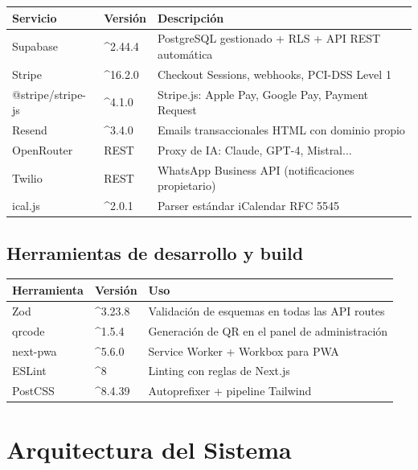 \documentclass[12pt,a4paper,twoside,openright]{report}
\begin{document}
\begin{longtable}{L{3.5cm} C{2cm} L{7cm}}
  \toprule
  \textbf{Servicio} & \textbf{Versión} & \textbf{Descripción} \\
  \midrule
  Supabase & \textasciicircum 2.44.4 & PostgreSQL gestionado + RLS + API REST automática \\
  Stripe & \textasciicircum 16.2.0 & Checkout Sessions, webhooks, PCI-DSS Level 1 \\
  @stripe/stripe-js & \textasciicircum 4.1.0 & Stripe.js: Apple Pay, Google Pay, Payment Request \\
  Resend & \textasciicircum 3.4.0 & Emails transaccionales HTML con dominio propio \\
  OpenRouter & REST & Proxy de IA: Claude, GPT-4, Mistral... \\
  Twilio & REST & WhatsApp Business API (notificaciones propietario) \\
  ical.js & \textasciicircum 2.0.1 & Parser estándar iCalendar RFC 5545 \\
  \bottomrule
\end{longtable}

\section{Herramientas de desarrollo y build}

\begin{longtable}{L{4cm} C{2.5cm} L{6cm}}
  \toprule
  \textbf{Herramienta} & \textbf{Versión} & \textbf{Uso} \\
  \midrule
  Zod & \textasciicircum 3.23.8 & Validación de esquemas en todas las API routes \\
  qrcode & \textasciicircum 1.5.4 & Generación de QR en el panel de administración \\
  next-pwa & \textasciicircum 5.6.0 & Service Worker + Workbox para PWA \\
  ESLint & \textasciicircum 8 & Linting con reglas de Next.js \\
  PostCSS & \textasciicircum 8.4.39 & Autoprefixer + pipeline Tailwind \\
  \bottomrule
\end{longtable}

\chapter{Arquitectura del Sistema}
\end{document}
